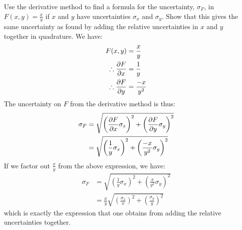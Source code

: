 \begin{example}{Use the derivative method to find a formula for the uncertainty, $\sigma_{F}$, in $F(x,y)=\frac{x}{y}$ if $x$ and $y$ have uncertainties $\sigma_{x}$ and $\sigma_{y}$. Show that this gives the same uncertainty as found by adding the relative uncertainties in $x$ and $y$ together in quadrature.}
We have:
\begin{align*}
F(x,y)&=\frac{x}{y}\\
\therefore \frac{\partial F}{\partial x}&=\frac{1}{y}\\
\therefore \frac{\partial F}{\partial y}&=\frac{-x}{y^2}
\end{align*}
The uncertainty on $F$ from the derivative method is thus:
\begin{align*}
\sigma_{F}&= \sqrt{\left(\frac{\partial F}{\partial x}\sigma_{x}\right)^2 + \left(\frac{\partial F}{\partial y} \sigma_{y}\right)^2}\\
  &= \sqrt{\left(\frac{1}{y}\sigma_{x}\right)^2 + \left(\frac{-x}{y^2} \sigma_{y}\right)^2}\\
\end{align*}
If we factor out $\frac{x}{y}$ from the above expression, we have:
\begin{align*}
\sigma_{F}&= \sqrt{\left(\frac{1}{y}\sigma_{x}\right)^2 + \left(\frac{x}{y^2} \sigma_{y}\right)^2}\\
&=\frac{x}{y}\sqrt{\left(\frac{\sigma_{x}}{x}\right)^2 + \left(\frac{\sigma_{y}}{y} \right)^2}
\end{align*}
which is exactly the expression that one obtains from adding the relative uncertainties together. 
\end{example}

